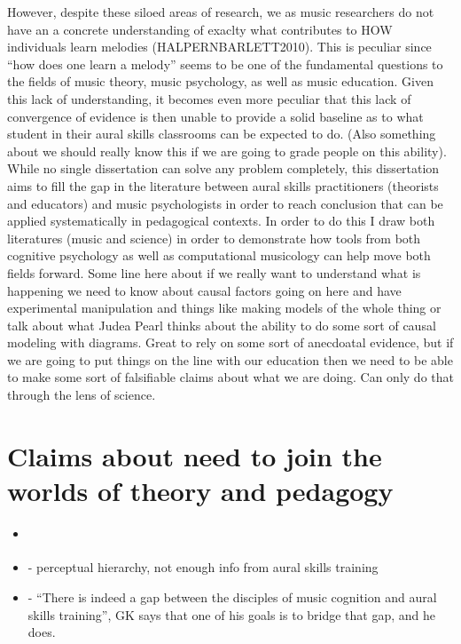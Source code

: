 \documentclass[]{book}
\providecommand{\tightlist}{%
  \setlength{\itemsep}{0pt}\setlength{\parskip}{0pt}}
\theoremstyle{definition}
\theoremstyle{definition}
\theoremstyle{definition}
\theoremstyle{remark}
\begin{document}
However, despite these siloed areas of research, we as music researchers
do not have an a concrete understanding of exaclty what contributes to
HOW individuals learn melodies (HALPERNBARLETT2010). This is peculiar
since ``how does one learn a melody'' seems to be one of the fundamental
questions to the fields of music theory, music psychology, as well as
music education. Given this lack of understanding, it becomes even more
peculiar that this lack of convergence of evidence is then unable to
provide a solid baseline as to what student in their aural skills
classrooms can be expected to do. (Also something about we should really
know this if we are going to grade people on this ability). While no
single dissertation can solve any problem completely, this dissertation
aims to fill the gap in the literature between aural skills
practitioners (theorists and educators) and music psychologists in order
to reach conclusion that can be applied systematically in pedagogical
contexts. In order to do this I draw both literatures (music and
science) in order to demonstrate how tools from both cognitive
psychology as well as computational musicology can help move both fields
forward. Some line here about if we really want to understand what is
happening we need to know about causal factors going on here and have
experimental manipulation and things like making models of the whole
thing or talk about what Judea Pearl thinks about the ability to do some
sort of causal modeling with diagrams. Great to rely on some sort of
anecdoatal evidence, but if we are going to put things on the line with
our education then we need to be able to make some sort of falsifiable
claims about what we are doing. Can only do that through the lens of
science.

\hypertarget{claims-about-need-to-join-the-worlds-of-theory-and-pedagogy}{%
\section{Claims about need to join the worlds of theory and
pedagogy}\label{claims-about-need-to-join-the-worlds-of-theory-and-pedagogy}}

\begin{itemize}
\tightlist
\item
  \citep{davidbutlerWhyGulfMusic1997a}
\item
  \citep{klonoskiPerceptualLearningHierarchy2000} - perceptual
  hierarchy, not enough info from aural skills training
\item
  \citep{karpinskiAuralSkillsAcquisition2000} - ``There is indeed a gap
  between the disciples of music cognition and aural skills training'',
  GK says that one of his goals is to bridge that gap, and he does.
\end{itemize}
\end{document}
